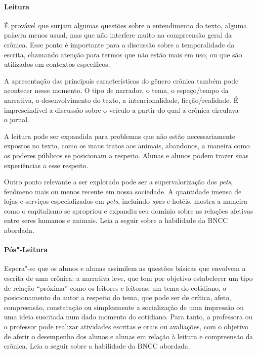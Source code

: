 \documentclass[11pt]{extarticle}
\begin{document}
\paragraph{Leitura}

É provável que surjam algumas questões sobre o entendimento do texto,
alguma palavra menos usual, mas que não interfere muito na compreensão
geral da crônica. Esse ponto é importante para a discussão sobre a
temporalidade da escrita, chamando atenção para termos que não estão
mais em uso, ou que são utilizados em contextos específicos.

A apresentação das principais características do gênero crônica também
pode acontecer nesse momento. O tipo de narrador, o tema, o espaço/tempo
da narrativa, o desenvolvimento do texto, a intencionalidade,
ficção/realidade. É imprescindível a discussão sobre o veículo a partir
do qual a crônica circulava --- o jornal.

A leitura pode ser expandida para problemas que não estão
necessariamente expostos no texto, como os maus tratos aos animais,
abandonos, a maneira como os poderes públicos se posicionam a respeito.
Alunas e alunos podem trazer suas experiências a esse respeito.

Outro ponto relevante a ser explorado pode ser a supervalorização dos
\emph{pets}, fenômeno mais ou menos recente em nossa sociedade. A
quantidade imensa de lojas e serviços especializados em \emph{pets},
incluindo \emph{spas} e hotéis, mostra a maneira como o capitalismo se
apropriou e expandiu seu domínio sobre as relações afetivas entre seres
humanos e animais.
Leia a seguir sobre a habilidade da BNCC abordada.

{\paragraph{Pós"-Leitura}}

Espera"-se que os alunos e alunas assimilem as questões básicas que
envolvem a escrita de uma crônica: a narrativa leve, que tem por
objetivo estabelecer um tipo de relação ``próxima'' como os leitores e
leitoras; um tema do cotidiano, o posicionamento do autor a respeito do
tema, que pode ser de crítica, afeto, compreensão, constatação ou
simplesmente a socialização de uma impressão ou uma ideia suscitada num
dado momento do cotidiano. Para tanto, a professora ou o professor pode
realizar atividades escritas e orais ou avaliações, com o objetivo de
aferir o desempenho dos alunos e alunas em relação à leitura e
compreensão da crônica. 
Leia a seguir sobre a habilidade da BNCC abordada.
\end{document}
